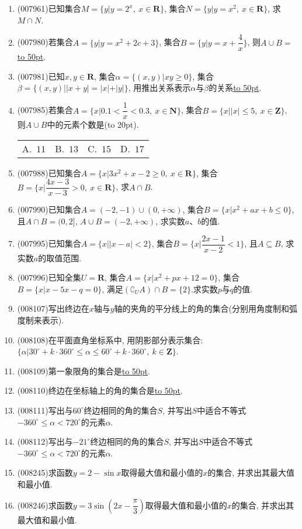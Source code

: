 \documentclass[10pt,a4paper]{article}
\newcommand{\blank}[1]{\underline{\hbox to #1pt{}}}
\newcommand{\bracket}[1]{(\hbox to #1pt{})}
\newcommand{\fourch}[4]{\par\begin{tabular}{p{.23\textwidth}p{.23\textwidth}p{.23\textwidth}p{.23\textwidth}}
A.~#1 &B.~#2& C.~#3& D.~#4
\end{tabular}}
\begin{document}
\begin{enumerate}[1.]
\item {\tiny (007961)}已知集合$M=\{y|y=2^x,\ x\in \mathbf{R}\}$, 集合$N=\{y|y=x^2,\ x\in \mathbf{R}\}$, 求$M\cap N$.
\item {\tiny (007980)}若集合$A=\{y|y=x^2+2c+3\}$, 集合$B=\{y|y=x+\dfrac 4x\}$, 则$A\cup B=$\blank{50}.
\item {\tiny (007981)}已知$x,y\in \mathbf{R}$, 集合$\alpha =\{(x,y)|xy\ge 0\}$, 集合$\beta =\{(x,y)||x+y|=|x|+|y|\}$, 用推出关系表示$\alpha$与$\beta$的关系\blank{50}.
\item {\tiny (007985)}若集合$A=\{x|0.1<\dfrac 1x<0.3,\ x\in \mathbf{N}\}$, 集合$B=\{x||x|\le 5,\ x\in \mathbf{Z}\}$, 则$A\cup B$中的元素个数是\bracket{20}.
\fourch{$11$}{$13$}{$15$}{$17$}
\item {\tiny (007988)}已知集合$A=\{x|3x^2+x-2\ge 0,\  x\in \mathbf{R}\}$, 集合$B=\{x|\dfrac{4x-3}{x-3}>0,\ x\in \mathbf{R}\}$, 求$A\cap B$.
\item {\tiny (007990)}已知集合$A=(-2,-1)\cup (0,+\infty)$, 集合$B=\{x|x^2+ax+b\le 0\}$, 且$A\cap B=(0,2]$, $A\cup B=(-2,+\infty)$, 求实数$a$、$b$的值.
\item {\tiny (007995)}已知集合$A=\{x||x-a|<2\}$, 集合$B=\{x|\dfrac{2x-1}{x-2}<1\}$, 且$A\subseteq B$, 求实数$a$的取值范围.
\item {\tiny (007996)}已知全集$U=\mathbf{R}$, 集合$A=\{x|x^2+px+12=0\}$, 集合$B=\{x|x-5x-q=0\}$, 满足$(\complement _UA)\cap B=\{2\}$.求实数$p$与$q$的值.
\item {\tiny (008107)}写出终边在$x$轴与$y$轴的夹角的平分线上的角的集合(分别用角度制和弧度制来表示).
\item {\tiny (008108)}在平面直角坐标系中, 用阴影部分表示集合: $\{\alpha|30^\circ+k\cdot 360^\circ\le \alpha \le 60^\circ+k\cdot 360^\circ, \ k\in \mathbf{Z}\}$.
\item {\tiny (008109)}第一象限角的集合是\blank{50}.
\item {\tiny (008110)}终边在坐标轴上的角的集合是\blank{50}.
\item {\tiny (008111)}写出与$60^\circ$终边相同的角的集合$S$, 并写出$S$中适合不等式$-360^\circ\le \alpha <720^\circ$的元素$\alpha$.
\item {\tiny (008112)}写出与$-21^\circ$终边相同的角的集合$S$, 并写出$S$中适合不等式$-360^\circ\le \alpha <720^\circ$的元素$\alpha$.
\item {\tiny (008245)}求函数$y=2-\sin x$取得最大值和最小值的$x$的集合, 并求出其最大值和最小值.
\item {\tiny (008246)}求函数$y=3\sin (2x-\dfrac{\pi}3)$取得最大值和最小值的$x$的集合, 并求出其最大值和最小值.

\end{enumerate}
\end{document}
